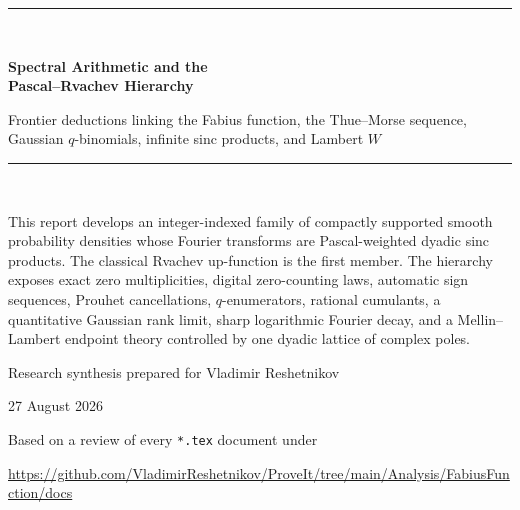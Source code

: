 \documentclass[11pt,a4paper]{article}
\theoremstyle{frontier}
\theoremstyle{definition}
\begin{document}
\hypersetup{pageanchor=false}

\begin{titlepage}
\centering
\vspace*{1.4cm}
{\color{navy}\rule{0.82\textwidth}{1.2pt}}\\[1.0cm]
{\Huge\bfseries\color{navy} Spectral Arithmetic and the\\[0.18em] Pascal--Rvachev Hierarchy\par}
\vspace{0.7cm}
{\Large\color{teal}Frontier deductions linking the Fabius function, the Thue--Morse sequence,\newline
Gaussian $q$-binomials, infinite sinc products, and Lambert $W$\par}
\vspace{1.0cm}
{\color{navy}\rule{0.82\textwidth}{0.6pt}}\\[1.3cm]

\begin{minipage}{0.84\textwidth}
\large
This report develops an integer-indexed family of compactly supported smooth probability densities whose Fourier transforms are Pascal-weighted dyadic sinc products.  The classical Rvachev up-function is the first member.  The hierarchy exposes exact zero multiplicities, digital zero-counting laws, automatic sign sequences, Prouhet cancellations, $q$-enumerators, rational cumulants, a quantitative Gaussian rank limit, sharp logarithmic Fourier decay, and a Mellin--Lambert endpoint theory controlled by one dyadic lattice of complex poles.
\end{minipage}

\vfill
{\large Research synthesis prepared for Vladimir Reshetnikov\par}
\vspace{0.25cm}
{\large 27 August 2026\par}
\vspace{0.8cm}
{\small Based on a review of every \texttt{*.tex} document under\par
\url{https://github.com/VladimirReshetnikov/ProveIt/tree/main/Analysis/FabiusFunction/docs}\par}
\end{titlepage}
\hypersetup{pageanchor=true}
\end{document}
